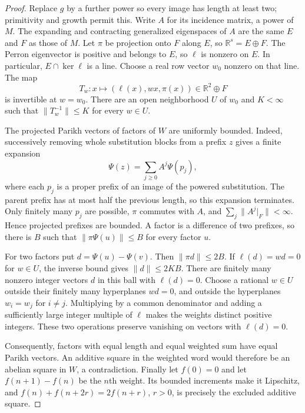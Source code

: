 \documentclass[11pt]{article}
\begin{document}
\begin{proof}
Replace $g$ by a further power so every image has length at least two;
primitivity and growth permit this. Write $A$ for its incidence matrix, a
power of $M$. The expanding and contracting generalized eigenspaces of $A$
are the same $E$ and $F$ as those of $M$. Let $\pi$ be projection onto $F$
along $E$, so $\mathbb R^s=E\oplus F$. The Perron eigenvector is positive
and belongs to $E$, so $\ell$ is nonzero on $E$.
In particular, $E\cap\ker\ell$ is a line.
Choose a real row vector $w_0$ nonzero on that line. The map
\[
 T_w:x\longmapsto (\ell(x),wx,\pi(x))\in\mathbb R^2\oplus F
\]
is invertible at $w=w_0$. There are an open neighborhood $U$ of $w_0$ and
$K<\infty$ such that $\|T_w^{-1}\|\le K$ for every $w\in U$.

The projected Parikh vectors of factors of $W$ are uniformly bounded.
Indeed, successively removing whole substitution blocks from a prefix $z$
gives a finite expansion
\[
 \Psi(z)=\sum_{j\ge0}A^j\Psi(p_j),
\]
where each $p_j$ is a proper prefix of an image of the powered substitution.
The parent prefix has at most half the previous length, so this expansion
terminates. Only finitely many $p_j$ are possible, $\pi$ commutes with $A$,
and $\sum_j\|A^j|_F\|<\infty$. Hence projected prefixes are bounded. A factor is
a difference of two prefixes, so there is $B$ such that
$\|\pi\Psi(u)\|\le B$ for every factor $u$.

For two factors put $d=\Psi(u)-\Psi(v)$. Then $\|\pi d\|\le2B$.
If $\ell(d)=wd=0$ for $w\in U$, the inverse bound gives $\|d\|\le2KB$.
There are finitely many nonzero integer vectors $d$ in this ball with
$\ell(d)=0$. Choose a rational $w\in U$ outside their finitely many
hyperplanes $wd=0$, and outside the hyperplanes $w_i=w_j$ for $i\ne j$.
Multiplying by a common denominator and adding a sufficiently large integer
multiple of $\ell$ makes the weights distinct positive integers. These two
operations preserve vanishing on vectors with $\ell(d)=0$.

Consequently, factors with equal length and equal weighted sum have equal
Parikh vectors. An additive square in the weighted word would therefore be an
abelian square in $W$, a contradiction. Finally let $f(0)=0$ and let
$f(n+1)-f(n)$ be the $n$th weight. Its bounded increments make it Lipschitz,
and $f(n)+f(n+2r)=2f(n+r)$, $r>0$, is precisely the excluded additive square.
\end{proof}
\end{document}

